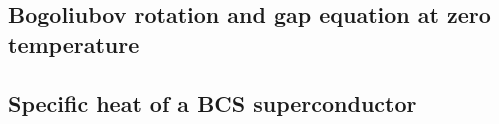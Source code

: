 \newpage

\subsection{Bogoliubov rotation and gap equation at zero temperature}





\newpage
\setcounter{section}{14}
\setcounter{subsection}{0}


\subsection{Specific heat of a BCS superconductor}






\newpage
